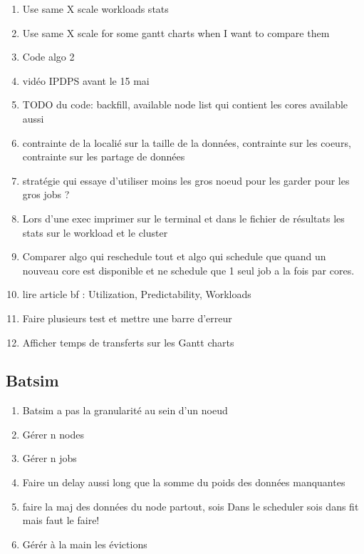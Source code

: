 \documentclass[a4paper]{article}
\begin{document}
\begin{enumerate}
			\item Use same X scale workloads stats
			\item Use same X scale for some gantt charts when I want to compare them
			\item Code algo 2
			\item vidéo IPDPS avant le 15 mai
			\item TODO du code: backfill, available node list qui contient les cores available aussi
			\item contrainte de la localié sur la taille de la données, contrainte sur les coeurs, contrainte sur les partage de données
			\item stratégie qui essaye d'utiliser moins les gros noeud pour les garder pour les gros jobs ?
			\item Lors d'une exec imprimer sur le terminal et dans le fichier de résultats les stats sur le workload et le cluster
			\item Comparer algo qui reschedule tout et algo qui schedule que quand un nouveau core est disponible et ne schedule que 1 seul job a la fois par cores.
			\item lire article bf : Utilization, Predictability, Workloads
			\item Faire plusieurs test et mettre une barre d'erreur
			\item Afficher temps de transferts sur les Gantt charts
		\end{enumerate}
	\subsection{Batsim}
		\begin{enumerate}
			\item Batsim a pas la granularité au sein d'un noeud
			\item Gérer n nodes
			\item Gérer n jobs
			\item Faire un delay aussi long que la somme du poids des données manquantes
			\item faire la maj des données du node partout, sois Dans le scheduler sois dans fit mais faut le faire!
			\item Gérér à la main les évictions
		\end{enumerate}
\end{document}
